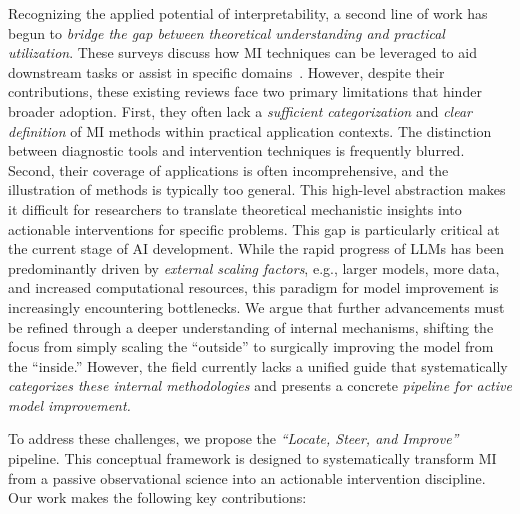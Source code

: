 \documentclass[11pt,letterpaper]{mystyle}
\begin{document}
Recognizing the applied potential of interpretability, a second line of work has begun to \textit{bridge the gap between theoretical understanding and practical utilization}. These surveys discuss how MI techniques can be leveraged to aid downstream tasks or assist in specific domains~\citep{luo2024understanding,wu2024usable,rai2024practical,bereska2024mechanistic,lee2025interpretation,resck2025explainability,lin2025survey}.
However, despite their contributions, these existing reviews face two primary limitations that hinder broader adoption.
First, they often lack a \textit{sufficient categorization} and \textit{clear definition} of MI methods within practical application contexts. 
The distinction between diagnostic tools and intervention techniques is frequently blurred.
Second, their coverage of applications is often incomprehensive, and the illustration of methods is typically too general. 
This high-level abstraction makes it difficult for researchers to translate theoretical mechanistic insights into actionable interventions for specific problems.
This gap is particularly critical at the current stage of AI development. While the rapid progress of LLMs has been predominantly driven by \textit{external scaling factors}, e.g., larger models, more data, and increased computational resources, this paradigm for model improvement is increasingly encountering bottlenecks. 
We argue that further advancements must be refined through a deeper understanding of internal mechanisms, shifting the focus from simply scaling the ``outside'' to surgically improving the model from the ``inside.'' However, the field currently lacks a unified guide that systematically \textit{categorizes these internal methodologies} and presents a concrete \textit{pipeline for active model improvement.}

To address these challenges, we propose the \textit{``Locate, Steer, and Improve''} pipeline. This conceptual framework is designed to systematically transform MI from a passive observational science into an actionable intervention discipline. Our work makes the following key contributions:
\end{document}
